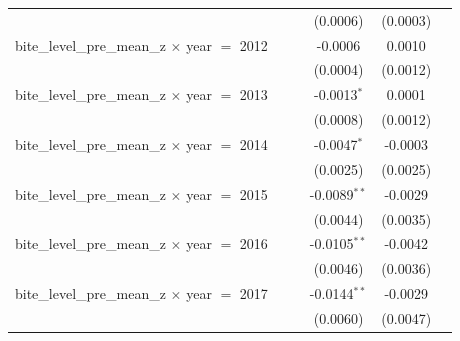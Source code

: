 \begin{tabular}{lccccc}
                                                                &                    &                 & (0.0006)              & (0.0003)                   &   \\   
   bite\_level\_pre\_mean\_z $\times$ year $=$ 2012             &                    &                 & -0.0006               & 0.0010                     &   \\   
                                                                &                    &                 & (0.0004)              & (0.0012)                   &   \\   
   bite\_level\_pre\_mean\_z $\times$ year $=$ 2013             &                    &                 & -0.0013$^{*}$         & 0.0001                     &   \\   
                                                                &                    &                 & (0.0008)              & (0.0012)                   &   \\   
   bite\_level\_pre\_mean\_z $\times$ year $=$ 2014             &                    &                 & -0.0047$^{*}$         & -0.0003                    &   \\   
                                                                &                    &                 & (0.0025)              & (0.0025)                   &   \\   
   bite\_level\_pre\_mean\_z $\times$ year $=$ 2015             &                    &                 & -0.0089$^{**}$        & -0.0029                    &   \\   
                                                                &                    &                 & (0.0044)              & (0.0035)                   &   \\   
   bite\_level\_pre\_mean\_z $\times$ year $=$ 2016             &                    &                 & -0.0105$^{**}$        & -0.0042                    &   \\   
                                                                &                    &                 & (0.0046)              & (0.0036)                   &   \\   
   bite\_level\_pre\_mean\_z $\times$ year $=$ 2017             &                    &                 & -0.0144$^{**}$        & -0.0029                    &   \\   
                                                                &                    &                 & (0.0060)              & (0.0047)                   &   \\   

\end{tabular}
